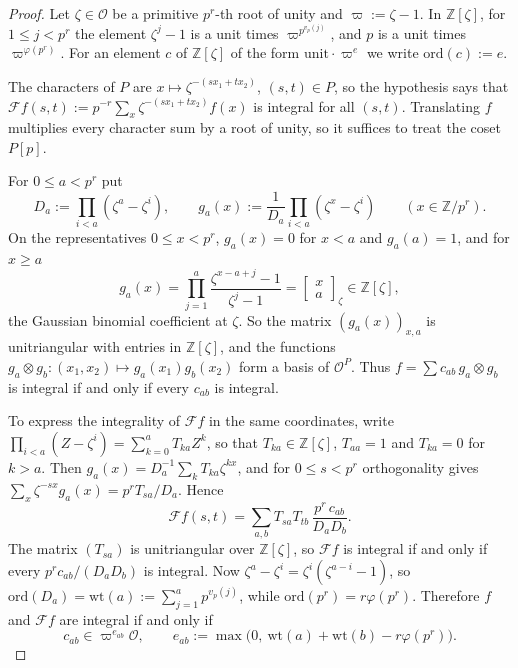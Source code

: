 \documentclass[11pt]{amsart}
\numberwithin{equation}{section}
\theoremstyle{plain}
\theoremstyle{definition}
\theoremstyle{remark}
\begin{document}
\begin{proof}
Let \(\zeta\in\mathcal O\) be a primitive \(p^r\)-th root of unity and \(\varpi:=\zeta-1\). In \(\mathbb Z[\zeta]\), for \(1\le j<p^r\) the element \(\zeta^j-1\) is a unit times \(\varpi^{p^{v_p(j)}}\), and \(p\) is a unit times \(\varpi^{\varphi(p^r)}\). For an element \(c\) of \(\mathbb Z[\zeta]\) of the form \(\text{unit}\cdot\varpi^e\) we write \(\mathrm{ord}(c):=e\).

The characters of \(P\) are \(x\mapsto\zeta^{-(sx_1+tx_2)}\), \((s,t)\in P\), so the hypothesis says that \(\mathcal Ff(s,t):=p^{-r}\sum_x\zeta^{-(sx_1+tx_2)}f(x)\) is integral for all \((s,t)\). Translating \(f\) multiplies every character sum by a root of unity, so it suffices to treat the coset \(P[p]\).

For \(0\le a<p^r\) put
\[D_a:=\prod_{i<a}(\zeta^a-\zeta^i),\qquad g_a(x):=\frac1{D_a}\prod_{i<a}(\zeta^x-\zeta^i)\qquad(x\in\mathbb Z/p^r).\]
On the representatives \(0\le x<p^r\), \(g_a(x)=0\) for \(x<a\) and \(g_a(a)=1\), and for \(x\ge a\)
\[g_a(x)=\prod_{j=1}^{a}\frac{\zeta^{x-a+j}-1}{\zeta^j-1}=\begin{bmatrix}x\\ a\end{bmatrix}_\zeta\in\mathbb Z[\zeta],\]
the Gaussian binomial coefficient at \(\zeta\). So the matrix \((g_a(x))_{x,a}\) is unitriangular with entries in \(\mathbb Z[\zeta]\), and the functions \(g_a\otimes g_b:(x_1,x_2)\mapsto g_a(x_1)g_b(x_2)\) form a basis of \(\mathcal O^P\). Thus \(f=\sum c_{ab}\,g_a\otimes g_b\) is integral if and only if every \(c_{ab}\) is integral.

To express the integrality of \(\mathcal Ff\) in the same coordinates, write \(\prod_{i<a}(Z-\zeta^i)=\sum_{k=0}^aT_{ka}Z^k\), so that \(T_{ka}\in\mathbb Z[\zeta]\), \(T_{aa}=1\) and \(T_{ka}=0\) for \(k>a\). Then \(g_a(x)=D_a^{-1}\sum_kT_{ka}\zeta^{kx}\), and for \(0\le s<p^r\) orthogonality gives \(\sum_x\zeta^{-sx}g_a(x)=p^rT_{sa}/D_a\). Hence
\[\mathcal Ff(s,t)=\sum_{a,b}T_{sa}T_{tb}\,\frac{p^r\,c_{ab}}{D_aD_b}.\]
The matrix \((T_{sa})\) is unitriangular over \(\mathbb Z[\zeta]\), so \(\mathcal Ff\) is integral if and only if every \(p^rc_{ab}/(D_aD_b)\) is integral. Now \(\zeta^a-\zeta^i=\zeta^i(\zeta^{a-i}-1)\), so \(\mathrm{ord}(D_a)=\mathrm{wt}(a):=\sum_{j=1}^ap^{v_p(j)}\), while \(\mathrm{ord}(p^r)=r\varphi(p^r)\). Therefore \(f\) and \(\mathcal Ff\) are integral if and only if
\[c_{ab}\in\varpi^{e_{ab}}\mathcal O,\qquad e_{ab}:=\max\bigl(0,\ \mathrm{wt}(a)+\mathrm{wt}(b)-r\varphi(p^r)\bigr).\]


\end{proof}
\end{document}
